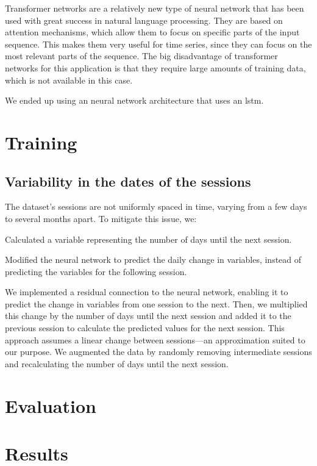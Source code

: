 Transformer networks are a relatively new type of neural network that has been
used with great success in natural language processing. They are based on
attention mechanisms, which allow them to focus on specific parts of the input
sequence. This makes them very useful for time series, since they can focus on
the most relevant parts of the sequence. The big disadvantage of transformer
networks for this application is that they require large amounts of training
data, which is not available in this case.

We ended up using an neural network architecture that uses an \gls{lstm}.

\section{Training}

\subsection{Variability in the dates of the sessions}

The dataset's sessions are not uniformly spaced in time, varying from a few
days to several months apart. To mitigate this issue, we:

Calculated a variable representing the number of days until the next session.

Modified the neural network to predict the daily change in variables, instead
of predicting the variables for the following session.

We implemented a residual connection to the neural network, enabling it to
predict the change in variables from one session to the next. Then, we
multiplied this change by the number of days until the next session and added
it to the previous session to calculate the predicted values for the next
session. This approach assumes a linear change between sessions—an
approximation suited to our purpose. We augmented the data by randomly removing
intermediate sessions and recalculating the number of days until the next
session.

\section{Evaluation}

\section{Results}